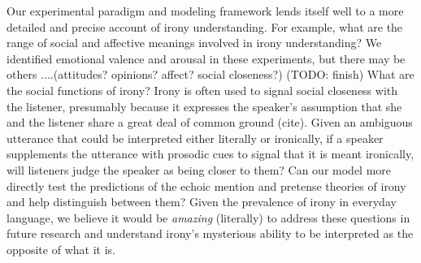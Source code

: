 \documentclass[10pt,letterpaper]{article}
\begin{document}
Our experimental paradigm and modeling framework lends itself well to a more detailed and precise account of irony understanding. For example, what are the range of social and affective meanings involved in irony understanding? We identified emotional valence and arousal in these experiments, but there may be others ....(attitudes? opinions? affect? social closeness?)
(TODO: finish) What are the social functions of irony? Irony is often used to signal social closeness with the listener, presumably because it expresses the speaker's assumption that she and the listener share a great deal of common ground (cite). Given an ambiguous utterance that could be interpreted either literally or ironically, if a speaker supplements the utterance with prosodic cues to signal that it is meant ironically, will listeners judge the speaker as being closer to them? Can our model more directly  test the predictions of the echoic mention and pretense theories of irony and help distinguish between them? Given the prevalence of irony in everyday language, we believe it would be \emph{amazing} (literally) to address these questions in future research and understand irony's mysterious ability to be interpreted as the opposite of what it is.



\setlength{\bibleftmargin}{.125in}
\setlength{\bibindent}{-\bibleftmargin}


\end{document}
